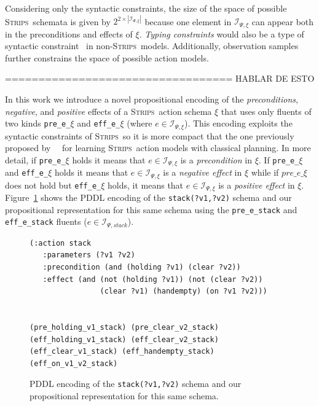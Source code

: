 \documentclass{article}
\newcommand{\strips}{\textsc{Strips}}
\begin{document}
Considering only the syntactic constraints, the size of the space of possible \strips\ schemata is given by $2^{2\times|{\mathcal I}_{\Psi,\xi}|}$ because one element in $\mathcal{I}_{\Psi,\xi}$ can appear both in the preconditions and effects of $\xi$. {\em Typing constraints} would also be a type of syntactic constraint~\cite{mcdermott1998pddl} in non-\strips\ models. Additionally, observation samples further constrains the space of possible action models.

==================================
\textcolor[rgb]{1.00,0.00,0.00}{HABLAR DE ESTO}

In this work we introduce a novel propositional encoding of the {\em preconditions}, {\em negative}, and {\em positive} effects of a \strips\ action schema $\xi$ that uses only fluents of two kinds {\tt\small pre\_e\_$\xi$} and {\tt\small eff\_e\_$\xi$} (where $e\in{\mathcal I}_{\Psi,\xi}$). This encoding exploits the syntactic constraints of \strips\, so it is more compact that the one previously proposed by~\citeauthor{aineto2018learning}~\citeyear{aineto2018learning} for learning \strips\ action models with classical planning. In more detail, if {\tt\small pre\_e\_$\xi$} holds it means that $e\in{\mathcal I}_{\Psi,\xi}$ is a {\em precondition} in $\xi$. If {\tt\small pre\_e\_$\xi$} and {\tt\small eff\_e\_$\xi$} holds it means that $e\in{\mathcal I}_{\Psi,\xi}$ is a {\em negative effect} in $\xi$ while if $pre\_e\_\xi$ does not hold but {\tt\small eff\_e\_$\xi$} holds, it means that $e\in{\mathcal I}_{\Psi,\xi}$ is a {\em positive effect} in $\xi$. Figure~\ref{fig:propositional} shows the PDDL encoding of the {\tt\small stack(?v1,?v2)} schema and our propositional representation for this same schema using the {\tt\small pre\_e\_stack} and {\tt\small eff\_e\_stack} fluents ($e\in{\mathcal I}_{\Psi,stack}$).

\begin{figure}
  \begin{tiny}
  \begin{verbatim}
(:action stack
   :parameters (?v1 ?v2)
   :precondition (and (holding ?v1) (clear ?v2))
   :effect (and (not (holding ?v1)) (not (clear ?v2))
                (clear ?v1) (handempty) (on ?v1 ?v2)))


(pre_holding_v1_stack) (pre_clear_v2_stack)
(eff_holding_v1_stack) (eff_clear_v2_stack)
(eff_clear_v1_stack) (eff_handempty_stack) (eff_on_v1_v2_stack)
  \end{verbatim}
  \end{tiny}
 \caption{\small PDDL encoding of the {\tt\small stack(?v1,?v2)} schema and our propositional representation for this same schema.}
\label{fig:propositional}
\end{figure}
\end{document}
